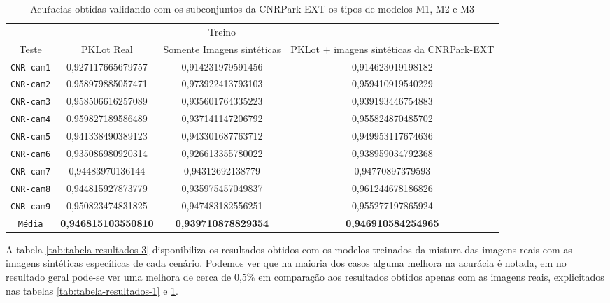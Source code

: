 \begin{table}[!htp] \footnotesize
    \centering
    \caption{Acuŕacias obtidas validando com os subconjuntos da CNRPark-EXT os tipos de modelos M1, M2 e M3}
    \label{tab:tabela-resultados-2}
    \begin{tabular}{cccc}
    \texttt{} &  & Treino &  \\
    \cline{2-4}
    \multicolumn{1}{c|}{Teste}& PKLot Real & Somente Imagens sintéticas & PKLot + imagens sintéticas da CNRPark-EXT \\
    \hline
    \texttt{CNR-cam1} & 0,927117665679757 & 0,914231979591456 & 0,914623019198182 \\
    \hline
    \texttt{CNR-cam2} & 0,958979885057471 & 0,973922413793103 & 0,959410919540229 \\
    \hline
    \texttt{CNR-cam3} & 0,958506616257089 & 0,935601764335223 & 0,939193446754883 \\
    \hline
    \texttt{CNR-cam4} & 0,959827189586489 & 0,937141147206792 & 0,955824870485702 \\
    \hline
    \texttt{CNR-cam5} & 0,941338490389123 & 0,943301687763712 & 0,949953117674636 \\
    \hline
    \texttt{CNR-cam6} & 0,935086980920314 & 0,926613355780022 & 0,938959034792368 \\
    \hline
    \texttt{CNR-cam7} & 0,94483970136144 & 0,94312692138779 & 0,94770897379593 \\
    \hline
    \texttt{CNR-cam8} & 0,944815927873779 & 0,935975457049837 & 0,961244678186826 \\
    \hline
    \texttt{CNR-cam9} & 0,950823474831825 & 0,947483182556251 & 0,955277197865924 \\
    \hline
    \texttt{Média} & \textbf{0,946815103550810} & \textbf{0,939710878829354} & \textbf{0,946910584254965} \\
    \hline
    \end{tabular}
\end{table}

A tabela \ref{tab:tabela-resultados-3} disponibiliza os resultados obtidos com os modelos treinados da mistura das imagens reais com as imagens sintéticas específicas de cada cenário. Podemos ver que na maioria dos casos alguma melhora na acurácia é notada, em no resultado geral pode-se ver uma melhora de cerca de 0,5\% em comparação aos resultados obtidos apenas com as imagens reais, explicitados nas tabelas \ref{tab:tabela-resultados-1} e \ref{tab:tabela-resultados-2}.

